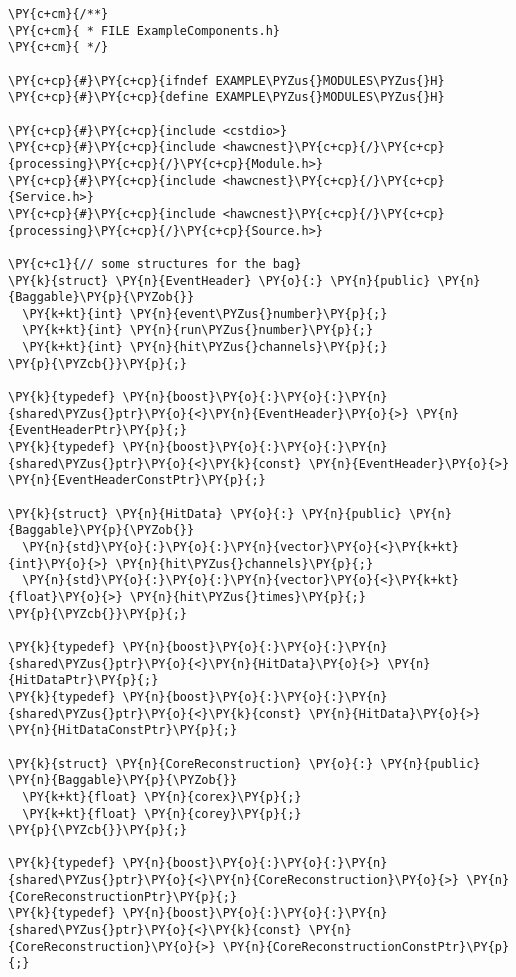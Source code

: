 \begin{Verbatim}[commandchars=\\\{\}]
\PY{c+cm}{/**}
\PY{c+cm}{ * FILE ExampleComponents.h}
\PY{c+cm}{ */}

\PY{c+cp}{#}\PY{c+cp}{ifndef EXAMPLE\PYZus{}MODULES\PYZus{}H}
\PY{c+cp}{#}\PY{c+cp}{define EXAMPLE\PYZus{}MODULES\PYZus{}H}

\PY{c+cp}{#}\PY{c+cp}{include <cstdio>}
\PY{c+cp}{#}\PY{c+cp}{include <hawcnest}\PY{c+cp}{/}\PY{c+cp}{processing}\PY{c+cp}{/}\PY{c+cp}{Module.h>}
\PY{c+cp}{#}\PY{c+cp}{include <hawcnest}\PY{c+cp}{/}\PY{c+cp}{Service.h>}
\PY{c+cp}{#}\PY{c+cp}{include <hawcnest}\PY{c+cp}{/}\PY{c+cp}{processing}\PY{c+cp}{/}\PY{c+cp}{Source.h>}

\PY{c+c1}{// some structures for the bag}
\PY{k}{struct} \PY{n}{EventHeader} \PY{o}{:} \PY{n}{public} \PY{n}{Baggable}\PY{p}{\PYZob{}}
  \PY{k+kt}{int} \PY{n}{event\PYZus{}number}\PY{p}{;}
  \PY{k+kt}{int} \PY{n}{run\PYZus{}number}\PY{p}{;}
  \PY{k+kt}{int} \PY{n}{hit\PYZus{}channels}\PY{p}{;}
\PY{p}{\PYZcb{}}\PY{p}{;}

\PY{k}{typedef} \PY{n}{boost}\PY{o}{:}\PY{o}{:}\PY{n}{shared\PYZus{}ptr}\PY{o}{<}\PY{n}{EventHeader}\PY{o}{>} \PY{n}{EventHeaderPtr}\PY{p}{;}
\PY{k}{typedef} \PY{n}{boost}\PY{o}{:}\PY{o}{:}\PY{n}{shared\PYZus{}ptr}\PY{o}{<}\PY{k}{const} \PY{n}{EventHeader}\PY{o}{>} \PY{n}{EventHeaderConstPtr}\PY{p}{;}

\PY{k}{struct} \PY{n}{HitData} \PY{o}{:} \PY{n}{public} \PY{n}{Baggable}\PY{p}{\PYZob{}}
  \PY{n}{std}\PY{o}{:}\PY{o}{:}\PY{n}{vector}\PY{o}{<}\PY{k+kt}{int}\PY{o}{>} \PY{n}{hit\PYZus{}channels}\PY{p}{;}
  \PY{n}{std}\PY{o}{:}\PY{o}{:}\PY{n}{vector}\PY{o}{<}\PY{k+kt}{float}\PY{o}{>} \PY{n}{hit\PYZus{}times}\PY{p}{;}
\PY{p}{\PYZcb{}}\PY{p}{;}

\PY{k}{typedef} \PY{n}{boost}\PY{o}{:}\PY{o}{:}\PY{n}{shared\PYZus{}ptr}\PY{o}{<}\PY{n}{HitData}\PY{o}{>} \PY{n}{HitDataPtr}\PY{p}{;}
\PY{k}{typedef} \PY{n}{boost}\PY{o}{:}\PY{o}{:}\PY{n}{shared\PYZus{}ptr}\PY{o}{<}\PY{k}{const} \PY{n}{HitData}\PY{o}{>} \PY{n}{HitDataConstPtr}\PY{p}{;}

\PY{k}{struct} \PY{n}{CoreReconstruction} \PY{o}{:} \PY{n}{public} \PY{n}{Baggable}\PY{p}{\PYZob{}}
  \PY{k+kt}{float} \PY{n}{corex}\PY{p}{;}
  \PY{k+kt}{float} \PY{n}{corey}\PY{p}{;}
\PY{p}{\PYZcb{}}\PY{p}{;}

\PY{k}{typedef} \PY{n}{boost}\PY{o}{:}\PY{o}{:}\PY{n}{shared\PYZus{}ptr}\PY{o}{<}\PY{n}{CoreReconstruction}\PY{o}{>} \PY{n}{CoreReconstructionPtr}\PY{p}{;}
\PY{k}{typedef} \PY{n}{boost}\PY{o}{:}\PY{o}{:}\PY{n}{shared\PYZus{}ptr}\PY{o}{<}\PY{k}{const} \PY{n}{CoreReconstruction}\PY{o}{>} \PY{n}{CoreReconstructionConstPtr}\PY{p}{;}


\end{Verbatim}
